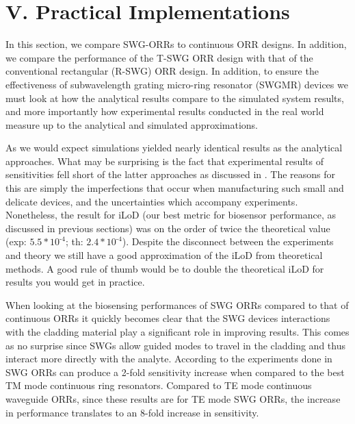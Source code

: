 \documentclass[aps,prl,twocolumn, superscriptaddress,nobalancelastpage]{revtex4}
\begin{document}
\twocolumngrid

\section{V. Practical Implementations}
\vspace{-1em}
In this section, we compare SWG-ORRs to continuous ORR designs. In addition, we compare the performance of the T-SWG ORR design with that of the conventional rectangular (R-SWG) ORR design. In addition, to ensure the effectiveness of subwavelength grating micro-ring resonator (SWGMR) devices we must look at how the analytical results compare to the simulated system results, and more importantly how experimental results conducted in the real world measure up to the analytical and simulated approximations.

As we would expect simulations yielded nearly identical results as the analytical approaches. What may be surprising is the fact that experimental results of sensitivities fell short of the latter approaches as discussed in \cite{swg3}. The reasons for this are simply the imperfections that occur when manufacturing such small and delicate devices, and the uncertainties which accompany experiments. Nonetheless, the result for iLoD (our best metric for biosensor performance, as discussed in previous sections) was on the order of twice the theoretical value (exp: $5.5*10^\text{-4}$; th: $2.4*10^\text{-4}$)\cite{swg3}. Despite the disconnect between the experiments and theory we still have a good approximation of the iLoD from theoretical methods. A good rule of thumb would be to double the theoretical iLoD for results you would get in practice.

When looking at the biosensing performances of SWG ORRs compared to that of continuous ORRs it quickly becomes clear that the SWG devices interactions with the cladding material play a significant role in improving results. This comes as no surprise since SWGs allow guided modes to travel in the cladding and thus interact more directly with the analyte. According to the experiments done in \cite{swg3} SWG ORRs can produce a 2-fold sensitivity increase when compared to the best TM mode continuous ring resonators. Compared to TE mode continuous waveguide ORRs, since these results are for TE mode SWG ORRs, the increase in performance translates to an 8-fold increase in sensitivity.
\end{document}

